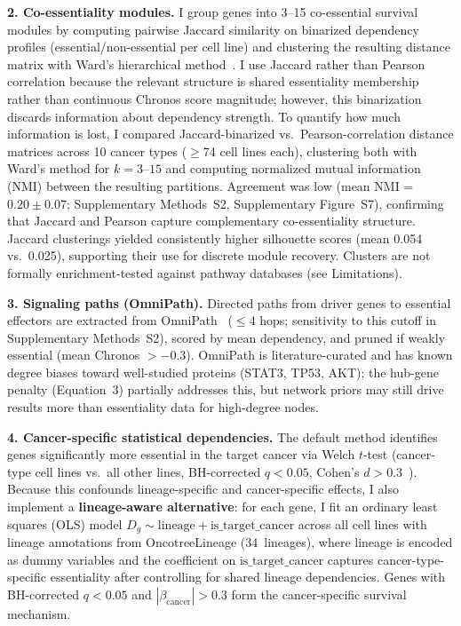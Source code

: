 \documentclass[times, twoside, watermark]{zHenriquesLab-StyleBioRxiv}
\begin{document}
\textbf{2. Co-essentiality modules.} I group genes into 3--15 co-essential survival modules by computing pairwise Jaccard similarity on binarized dependency profiles (essential/non-essential per cell line) and clustering the resulting distance matrix with Ward's hierarchical method~\cite{Pan2018}. I use Jaccard rather than Pearson correlation because the relevant structure is shared essentiality membership rather than continuous Chronos score magnitude; however, this binarization discards information about dependency strength. To quantify how much information is lost, I compared Jaccard-binarized vs.\ Pearson-correlation distance matrices across 10 cancer types ($\geq$74 cell lines each), clustering both with Ward's method for $k = 3$--$15$ and computing normalized mutual information (NMI) between the resulting partitions. Agreement was low (mean NMI = $0.20 \pm 0.07$; Supplementary Methods~S2, Supplementary Figure~S7), confirming that Jaccard and Pearson capture complementary co-essentiality structure. Jaccard clusterings yielded consistently higher silhouette scores (mean 0.054 vs.\ 0.025), supporting their use for discrete module recovery. Clusters are not formally enrichment-tested against pathway databases (see Limitations).

\textbf{3. Signaling paths (OmniPath).} Directed paths from driver genes to essential effectors are extracted from OmniPath~\cite{Turei2026} ($\leq$4 hops; sensitivity to this cutoff in Supplementary Methods~S2), scored by mean dependency, and pruned if weakly essential (mean Chronos $> -0.3$). OmniPath is literature-curated and has known degree biases toward well-studied proteins (STAT3, TP53, AKT); the hub-gene penalty (Equation~3) partially addresses this, but network priors may still drive results more than essentiality data for high-degree nodes.

\textbf{4. Cancer-specific statistical dependencies.} The default method identifies genes significantly more essential in the target cancer via Welch $t$-test (cancer-type cell lines vs.\ all other lines, BH-corrected $q < 0.05$, Cohen's $d > 0.3$~\cite{Benjamini1995,Cohen1988}). Because this confounds lineage-specific and cancer-specific effects, I also implement a \textbf{lineage-aware alternative}: for each gene, I fit an ordinary least squares (OLS) model $D_g \sim \text{lineage} + \text{is\_target\_cancer}$ across all cell lines with lineage annotations from OncotreeLineage (34~lineages), where lineage is encoded as dummy variables and the coefficient on $\text{is\_target\_cancer}$ captures cancer-type-specific essentiality after controlling for shared lineage dependencies. Genes with BH-corrected $q < 0.05$ and $|\beta_{\text{cancer}}| > 0.3$ form the cancer-specific survival mechanism.
\end{document}
